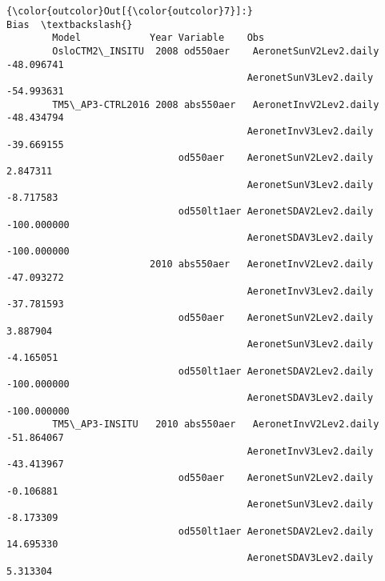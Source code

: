 \documentclass[11pt]{article}
\begin{document}
\begin{Verbatim}[commandchars=\\\{\}]
{\color{outcolor}Out[{\color{outcolor}7}]:}                                                                 Bias  \textbackslash{}
        Model            Year Variable    Obs                                  
        OsloCTM2\_INSITU  2008 od550aer    AeronetSunV2Lev2.daily  -48.096741   
                                          AeronetSunV3Lev2.daily  -54.993631   
        TM5\_AP3-CTRL2016 2008 abs550aer   AeronetInvV2Lev2.daily  -48.434794   
                                          AeronetInvV3Lev2.daily  -39.669155   
                              od550aer    AeronetSunV2Lev2.daily    2.847311   
                                          AeronetSunV3Lev2.daily   -8.717583   
                              od550lt1aer AeronetSDAV2Lev2.daily -100.000000   
                                          AeronetSDAV3Lev2.daily -100.000000   
                         2010 abs550aer   AeronetInvV2Lev2.daily  -47.093272   
                                          AeronetInvV3Lev2.daily  -37.781593   
                              od550aer    AeronetSunV2Lev2.daily    3.887904   
                                          AeronetSunV3Lev2.daily   -4.165051   
                              od550lt1aer AeronetSDAV2Lev2.daily -100.000000   
                                          AeronetSDAV3Lev2.daily -100.000000   
        TM5\_AP3-INSITU   2010 abs550aer   AeronetInvV2Lev2.daily  -51.864067   
                                          AeronetInvV3Lev2.daily  -43.413967   
                              od550aer    AeronetSunV2Lev2.daily   -0.106881   
                                          AeronetSunV3Lev2.daily   -8.173309   
                              od550lt1aer AeronetSDAV2Lev2.daily   14.695330   
                                          AeronetSDAV3Lev2.daily    5.313304   
        

\end{Verbatim}
\end{document}
